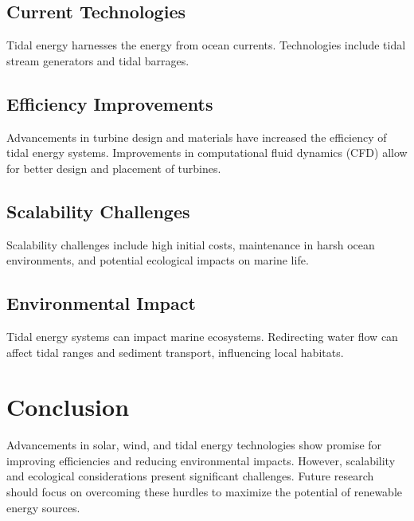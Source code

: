 \documentclass[12pt]{article}
\begin{document}
\subsection{Current Technologies}
Tidal energy harnesses the energy from ocean currents. Technologies include tidal stream generators and tidal barrages\cite{Khan2009}.

\subsection{Efficiency Improvements}
Advancements in turbine design and materials have increased the efficiency of tidal energy systems. Improvements in computational fluid dynamics (CFD) allow for better design and placement of turbines\cite{Bahaj2011}.

\subsection{Scalability Challenges}
Scalability challenges include high initial costs, maintenance in harsh ocean environments, and potential ecological impacts on marine life\cite{Polagye2010}.

\subsection{Environmental Impact}
Tidal energy systems can impact marine ecosystems. Redirecting water flow can affect tidal ranges and sediment transport, influencing local habitats\cite{Wright2016}.

\section{Conclusion}
Advancements in solar, wind, and tidal energy technologies show promise for improving efficiencies and reducing environmental impacts. However, scalability and ecological considerations present significant challenges. Future research should focus on overcoming these hurdles to maximize the potential of renewable energy sources.



\end{document}
